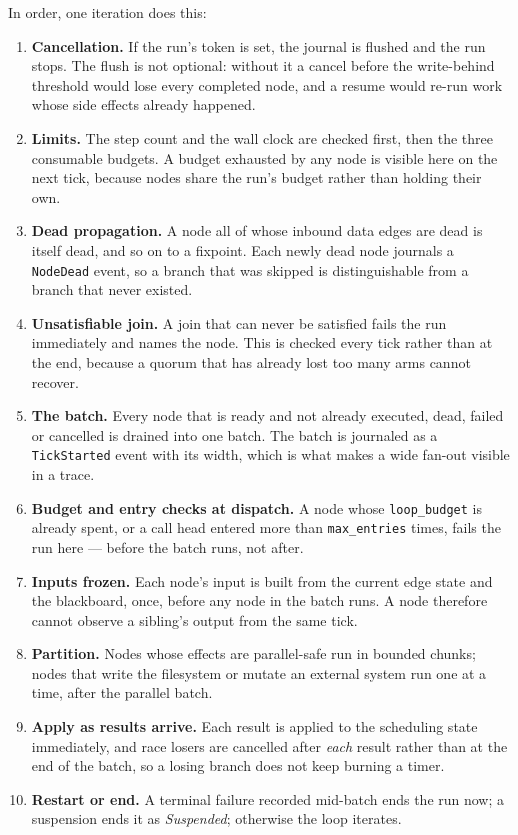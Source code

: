 In order, one iteration does this:

\begin{enumerate}
	\item \textbf{Cancellation.} If the run's token is set, the journal is flushed and the run stops.
	The flush is not optional: without it a cancel before the write-behind threshold would lose every
	completed node, and a resume would re-run work whose side effects already happened.
	\item \textbf{Limits.} The step count and the wall clock are checked first, then the three
	consumable budgets. A budget exhausted by any node is visible here on the next tick, because
	nodes share the run's budget rather than holding their own.
	\item \textbf{Dead propagation.} A node all of whose inbound data edges are dead is itself dead,
	and so on to a fixpoint. Each newly dead node journals a \texttt{NodeDead} event, so a branch
	that was skipped is distinguishable from a branch that never existed.
	\item \textbf{Unsatisfiable join.} A join that can never be satisfied fails the run immediately
	and names the node. This is checked every tick rather than at the end, because a quorum that has
	already lost too many arms cannot recover.
	\item \textbf{The batch.} Every node that is ready and not already executed, dead, failed or
	cancelled is drained into one batch. The batch is journaled as a \texttt{TickStarted} event with
	its width, which is what makes a wide fan-out visible in a trace.
	\item \textbf{Budget and entry checks at dispatch.} A node whose \texttt{loop\_budget} is
	already spent, or a call head entered more than \texttt{max\_entries} times, fails the run here
	--- before the batch runs, not after.
	\item \textbf{Inputs frozen.} Each node's input is built from the current edge state and the
	blackboard, once, before any node in the batch runs. A node therefore cannot observe a sibling's
	output from the same tick.
	\item \textbf{Partition.} Nodes whose effects are parallel-safe run in bounded chunks; nodes that
	write the filesystem or mutate an external system run one at a time, after the parallel batch.
	\item \textbf{Apply as results arrive.} Each result is applied to the scheduling state
	immediately, and race losers are cancelled after \emph{each} result rather than at the end of the
	batch, so a losing branch does not keep burning a timer.
	\item \textbf{Restart or end.} A terminal failure recorded mid-batch ends the run now; a
	suspension ends it as \emph{Suspended}; otherwise the loop iterates.
\end{enumerate}

